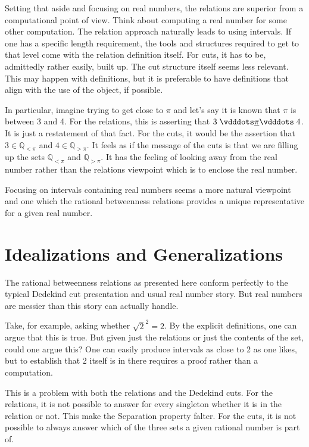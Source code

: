 \documentclass[12pt]{article}
\newcommand{\qcut}[2][x]{\ensuremath{\mathbb{Q}_{#2 #1}}}
\newcommand{\qlt}[1][x]{\qcut[#1]{<}}
\newcommand{\qgt}[1][x]{\qcut[#1]{>}}
\begin{document}
Setting that aside and focusing on real numbers, the relations are superior from a computational point of view. Think about computing a real number for some other computation. The relation approach naturally leads to using intervals. If one has a specific length requirement, the tools and structures required to get to that level come with the relation definition itself. For cuts, it has to be, admittedly rather easily, built up. The cut structure itself seems less relevant. This may happen with definitions, but it is preferable to have definitions that align with the use of the object, if possible. 

In particular, imagine trying to get close to $\pi$ and let's say it is known that $\pi$ is between 3 and 4. For the relations, this is asserting that $3 \xrel[\pi] 4$. It is just a restatement of that fact. For the cuts, it would be the assertion that $3 \in \qlt[\pi]$ and $4 \in \qgt[\pi]$. It feels as if the message of the cuts is that we are filling up the sets $\qlt[\pi]$ and $\qgt[\pi]$. It has the feeling of looking away from the real number rather than the relations viewpoint which is to enclose the real number. 

Focusing on intervals containing real numbers seems a more natural viewpoint and one which the rational betweenness relations provides a unique representative for a given real number. 


\section{Idealizations and Generalizations}

The rational betweenness relations as presented here conform perfectly to the typical Dedekind cut presentation and usual real number story. But real numbers are messier than this story can actually handle. 

Take, for example, asking whether $\sqrt{2}^2 = 2$. By the explicit definitions, one can argue that this is true. But given just the relations or just the contents of the set, could one argue this? One can easily produce intervals as close to 2 as one likes, but to establish that 2 itself is in there requires a proof rather than a computation. 

This is a problem with both the relations and the Dedekind cuts. For the relations, it is not possible to answer for every singleton whether it is in the relation or not. This make the Separation property falter. For the cuts, it is not possible to always answer which of the three sets a given rational number is part of. 
\end{document}
